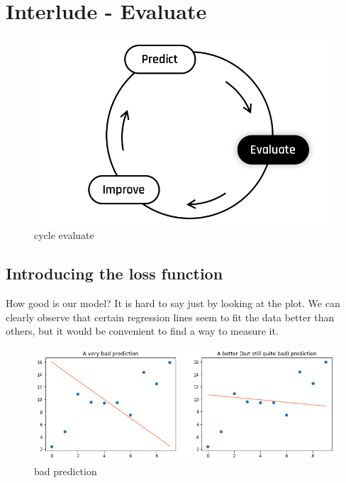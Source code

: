
\section*{Interlude - Evaluate}

\begin{figure}[h!]
  \centering
  \includegraphics[scale=0.25]{assets/Evaluate.png}
  \caption{cycle evaluate}
\end{figure}

\subsection*{Introducing the loss function}

How good is our model?  
It is hard to say just by looking at the plot.
We can clearly observe that certain regression lines seem to fit the data better than others, but it would be convenient to find a way to measure it. 

\begin{figure}[h!]
  \centering
  \includegraphics[scale=0.55]{assets/bad_prediction.png}
  \caption{bad prediction}
\end{figure}

